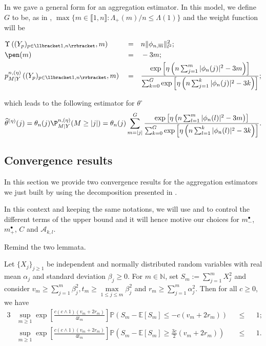 In  we gave a general form for an aggregation estimator.
In this model, we define $G$ to be, as in , $\max\{m \in \llbracket 1, n \rrbracket : \Lambda_{+}(m)/n \leq \Lambda(1)\}$ and the weight function will be

\begin{alignat*}{3}
& \Upsilon\left((Y_{p})_{p \in \llbracket 1, n \rrbracket}, m\right) && = && n \Vert \phi_{n, \overline{m}} \Vert_{l^{2}}^{2}; \\
& \pen(m) && = && - 3 m;\\
& p_{M \vert Y}^{n, (\eta)}\left((Y_{p})_{p \in \llbracket 1, n \rrbracket}, m \right) && = && \frac{\exp\left[\eta \left(n \sum_{j = 1}^{m} \vert \phi_{n}(j) \vert^{2} - 3 m\right)\right]}{\sum_{k = 0}^{G} \exp\left[\eta \left(n \sum_{j = 1}^{k} \vert \phi_{n}(j) \vert^{2} - 3 k\right)\right]};
\end{alignat*}

which leads to the following estimator for $\theta^{\circ}$
\[\widehat{\theta}^{(\eta)}(j) = \theta_{n}(j) \P_{M \vert Y}^{n, (\eta)}(M \geq \vert j \vert) = \theta_{n}(j) \sum_{m = \vert j \vert}^{G} \frac{\exp\left[\eta \left(n \sum_{l = 1}^{m} \vert \phi_{n}(l) \vert^{2} - 3 m\right)\right]}{\sum_{k = 0}^{G} \exp\left[\eta \left(n \sum_{l = 1}^{k} \vert \phi_{n}(l) \vert^{2} - 3 k\right)\right]}.\]


\subsection{Convergence results}
In this section we provide two convergence results for the aggregation estimators we just built by using the decomposition presented in .

In this context and keeping the same notations, we will use  and  to control the different terms of the upper bound and it will hence motive our choices for $m^{\bullet}_{-}$, $m^{\bullet}_{+}$, $C$ and $\mathcal{A}_{k, l}$.

Remind the two lemmata.

\begin{lm*}
Let $\{X_{j}\}_{j \geq 1}$ be independent and normally distributed random variables with real mean $\alpha_{j}$ and standard deviation $\beta_{j} \geq 0$. For $m \in \mathds{N}$, set $S_{m} := \sum \limits_{j = 1}^{m} X_{j}^{2}$ and consider $v_{m} \geq \sum\limits_{j = 1}^{m} \beta_{j}^{2}, t_{m} \geq \max \limits_{1 \leq j \leq m} \beta_{j}^{2}$ and $r_{m} \geq \sum\limits_{j = 1}^{m} \alpha_{j}^{2}$.
Then for all $c \geq 0$, we have
\begin{alignat*}{3}
&\sup\limits_{m \geq 1} \exp\left[\frac{c (c \wedge 1) (v_{m} + 2 r_{m})}{4 t_{m}}\right]\mathds{P}\left(S_{m} - \mathds{E}[S_{m}] \leq - c (v_{m} + 2 r_{m})\right) &&\leq&& 1; \\
&\sup\limits_{m \geq 1} \exp\left[\frac{c (c \wedge 1) (v_{m} + 2 r_{m})}{4 t_{m}}\right]\mathds{P}\left(S_{m} - \mathds{E}[S_{m}] \geq \frac{3 c}{2} (v_{m} + 2 r_{m})\right) &&\leq&& 1.
\end{alignat*}
\end{lm*}

